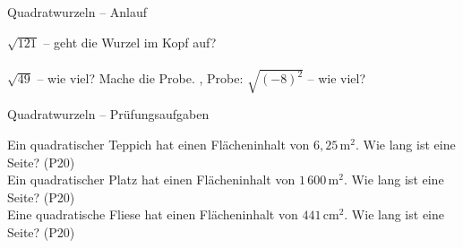 \setcounter{aufgabe}{0}

\begin{aufgabe}{Quadratwurzeln – Anlauf}
\begin{teile}
\teil $\sqrt{121}$ – geht die Wurzel im Kopf auf?\\  \\ 
\teil $\sqrt{49}$ – wie viel? Mache die Probe. \leerfeld , Probe: \leerfeld
\teil $\sqrt{(-8)^2}$ – wie viel? \leerfeld
\end{teile}
\end{aufgabe}

\begin{aufgabe}{Quadratwurzeln – Prüfungsaufgaben}
\begin{teile}
\teil Ein quadratischer Teppich hat einen Flächeninhalt von $6{,}25\,\text{m}^2$. Wie lang ist eine Seite? \hfill (P20) \\ \leerfeld[m]
\teil Ein quadratischer Platz hat einen Flächeninhalt von $1\,600\,\text{m}^2$. Wie lang ist eine Seite? \hfill (P20) \\ \leerfeld[m]
\teil Eine quadratische Fliese hat einen Flächeninhalt von $441\,\text{cm}^2$. Wie lang ist eine Seite? \hfill (P20) \\ \leerfeld[cm]
\end{teile}
\end{aufgabe}

